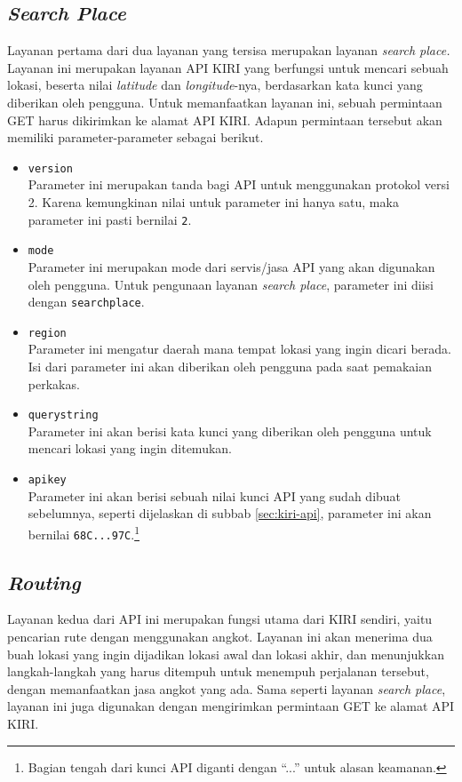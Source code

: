 \subsection{\textit{Search Place}}
\label{sec:analysis-kiri-searchplace}

Layanan pertama dari dua layanan yang tersisa merupakan layanan \textit{search place.} Layanan ini merupakan layanan API KIRI yang berfungsi untuk mencari sebuah lokasi, beserta nilai \textit{latitude} dan \textit{longitude}-nya, berdasarkan kata kunci yang diberikan oleh pengguna. Untuk memanfaatkan layanan ini, sebuah permintaan GET harus dikirimkan ke alamat API KIRI. Adapun permintaan tersebut akan memiliki parameter-parameter sebagai berikut.

\begin{itemize}
	\item \verb|version|\\
	Parameter ini merupakan tanda bagi API untuk menggunakan protokol versi 2. Karena kemungkinan nilai untuk parameter ini hanya satu, maka parameter ini pasti bernilai \verb|2|.
	\item \verb|mode|\\
	Parameter ini merupakan mode dari servis/jasa API yang akan digunakan oleh pengguna. Untuk pengunaan layanan \textit{search place}, parameter ini diisi dengan \verb|searchplace|.
	\item \verb|region|\\
	Parameter ini mengatur daerah mana tempat lokasi yang ingin dicari berada. Isi dari parameter ini akan diberikan oleh pengguna pada saat pemakaian perkakas.
	\item \verb|querystring|\\
	Parameter ini akan berisi kata kunci yang diberikan oleh pengguna untuk mencari lokasi yang ingin ditemukan.
	\item \verb|apikey|\\
	Parameter ini akan berisi sebuah nilai kunci API yang sudah dibuat sebelumnya, seperti dijelaskan di subbab \ref{sec:kiri-api}, parameter ini akan bernilai \verb|68C...97C|.\footnote{Bagian tengah dari kunci API diganti dengan ``...'' untuk alasan keamanan.}
\end{itemize}

\subsection{\textit{Routing}}
\label{sec:analysis-kiri-findroute}

Layanan kedua dari API ini merupakan fungsi utama dari KIRI sendiri, yaitu pencarian rute dengan menggunakan angkot. Layanan ini akan menerima dua buah lokasi yang ingin dijadikan lokasi awal dan lokasi akhir, dan menunjukkan langkah-langkah yang harus ditempuh untuk menempuh perjalanan tersebut, dengan memanfaatkan jasa angkot yang ada. Sama seperti layanan \textit{search place}, layanan ini juga digunakan dengan mengirimkan permintaan GET ke alamat API KIRI.

